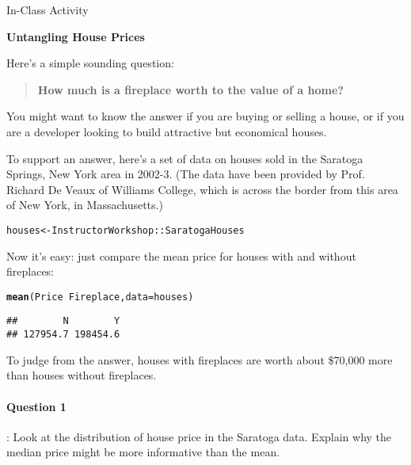 \documentclass{article}\usepackage[]{graphicx}\usepackage[]{color}
\makeatletter
\newcommand{\hlopt}[1]{\textcolor[rgb]{0,0,0}{#1}}%
\newcommand{\hlstd}[1]{\textcolor[rgb]{0.345,0.345,0.345}{#1}}%
\newcommand{\hlkwb}[1]{\textcolor[rgb]{0.69,0.353,0.396}{#1}}%
\newcommand{\hlkwc}[1]{\textcolor[rgb]{0.333,0.667,0.333}{#1}}%
\newcommand{\hlkwd}[1]{\textcolor[rgb]{0.737,0.353,0.396}{\textbf{#1}}}%
\newenvironment{kframe}{%
 \def\at@end@of@kframe{}%
 \ifinner\ifhmode%
  \def\at@end@of@kframe{\end{minipage}}%
  \begin{minipage}{\columnwidth}%
 \fi\fi%
 \def\FrameCommand##1{\hskip\@totalleftmargin \hskip-\fboxsep
 \colorbox{shadecolor}{##1}\hskip-\fboxsep
     \hskip-\linewidth \hskip-\@totalleftmargin \hskip\columnwidth}%
 \MakeFramed {\advance\hsize-\width
   \@totalleftmargin\z@ \linewidth\hsize
   \@setminipage}}%
 {\par\unskip\endMakeFramed%
 \at@end@of@kframe}
\newenvironment{knitrout}{}{} %
\makeatother
\begin{document}
\centerline{\Large \sf In-Class Activity}
\bigskip

\centerline{\Large \bfseries Untangling House Prices}

\bigskip

\bigskip



\begin{multicols}{2}
\noindent Here's a simple sounding question:
\begin{quotation}
\noindent\bf How much is a fireplace worth to the value of a home?
\end{quotation}

You might want to know the answer if you are buying or selling a house, or if you are a developer looking to build attractive but economical houses.

To support an answer, here's a set of data on houses sold in the Saratoga Springs, New York area in 2002-3.  (The data have been provided by Prof. Richard De Veaux of Williams College, which is across the border from this area of New York, in Massachusetts.)

\begin{knitrout}
\color{fgcolor}\begin{kframe}
\begin{alltt}
\hlstd{houses} \hlkwb{<-} \hlstd{InstructorWorkshop}\hlopt{::}\hlstd{SaratogaHouses}
\end{alltt}
\end{kframe}
\end{knitrout}

Now it's easy: just compare the mean price for houses with and without fireplaces:
\begin{knitrout}
\color{fgcolor}\begin{kframe}
\begin{alltt}
\hlkwd{mean}\hlstd{( Price} \hlopt{~} \hlstd{Fireplace,} \hlkwc{data}\hlstd{=houses )}
\end{alltt}
\begin{verbatim}
##        N        Y 
## 127954.7 198454.6
\end{verbatim}
\end{kframe}
\end{knitrout}
To judge from the answer, houses with fireplaces are worth about \$70,000 more than houses without fireplaces.

\bigskip

\paragraph{Question 1}: Look at the distribution of house price in the Saratoga data.  Explain why the median price might be more informative than the mean.


\end{multicols}
\end{document}
